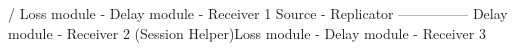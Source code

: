 \begin{program}
                    / Loss module - Delay module - Receiver 1
Source - Replicator --------------- Delay module - Receiver 2
    (Session Helper)\bs Loss module - Delay module - Receiver 3

\end{program}

\endinput

### Local Variables:
### mode: latex
### comment-column: 60
### backup-by-copying-when-linked: t
### file-precious-flag: nil
### End:
